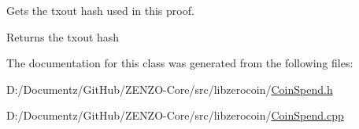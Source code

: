 Gets the txout hash used in this proof.

\begin{DoxyReturn}{Returns}
the txout hash 
\end{DoxyReturn}


The documentation for this class was generated from the following files\+:\begin{DoxyCompactItemize}
\item 
D\+:/\+Documentz/\+Git\+Hub/\+Z\+E\+N\+Z\+O-\/\+Core/src/libzerocoin/\mbox{\hyperlink{_coin_spend_8h}{Coin\+Spend.\+h}}\item 
D\+:/\+Documentz/\+Git\+Hub/\+Z\+E\+N\+Z\+O-\/\+Core/src/libzerocoin/\mbox{\hyperlink{_coin_spend_8cpp}{Coin\+Spend.\+cpp}}\end{DoxyCompactItemize}

